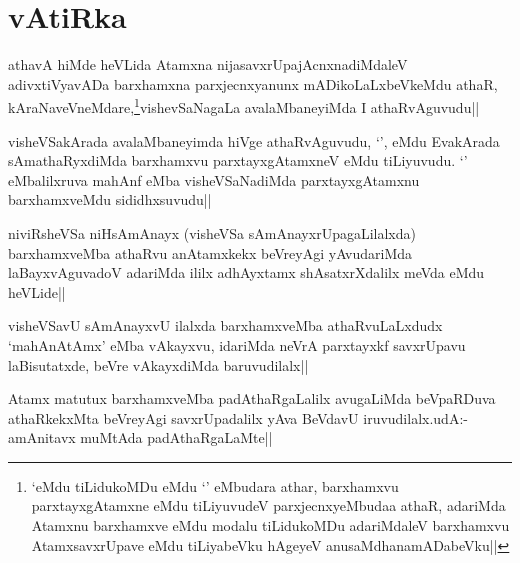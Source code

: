 \section*{vAtiRka}


\begin{artha}
athavA hiMde heVLida Atamxna nijasavxrUpajAcnxnadiMdaleV adivxtiVyavADa barxhamxna parxjecnxyanunx mADikoLaLxbeVkeMdu athaR, kAraNaveVneMdare,\footnote{`\stext eMdu tiLidukoMDu eMdu `\stext' eMbudara athar, barxhamxvu parxtayxgAtamxne eMdu tiLiyuvudeV parxjecnxyeMbudaa athaR, adariMda Atamxnu barxhamxve eMdu modalu tiLidukoMDu adariMdaleV barxhamxvu AtamxsavxrUpave eMdu tiLiyabeVku hAgeyeV anusaMdhanamADabeVku||}vishevSaNagaLa avalaMbaneyiMda I athaRvAguvudu||
\end{artha}

\begin{artha}
visheVSakArada avalaMbaneyimda hiVge athaRvAguvudu, `\stext', eMdu EvakArada sAmathaRyxdiMda barxhamxvu parxtayxgAtamxneV eMdu tiLiyuvudu. `\stext' eMbalilxruva mahAnf eMba visheVSaNadiMda parxtayxgAtamxnu barxhamxveMdu sididhxsuvudu||
\end{artha}


\begin{artha}
niviRsheVSa niHsAmAnayx (visheVSa sAmAnayxrUpagaLilalxda) barxhamxveMba athaRvu anAtamxkekx beVreyAgi yAvudariMda laBayxvAguvadoV adariMda ililx adhAyxtamx shAsatxrXdalilx meVda eMdu heVLide||
\end{artha}


\begin{artha}
visheVSavU sAmAnayxvU ilalxda barxhamxveMba athaRvuLaLxdudx `mahAnAtAmx' eMba vAkayxvu, idariMda neVrA parxtayxkf savxrUpavu laBisutatxde, beVre vAkayxdiMda baruvudilalx||
\end{artha}


\begin{artha}
Atamx matutux barxhamxveMba padAthaRgaLalilx avugaLiMda beVpaRDuva athaRkekxMta beVreyAgi savxrUpadalilx yAva BeVdavU iruvudilalx.udA:-amAnitavx muMtAda padAthaRgaLaMte||
\end{artha}

